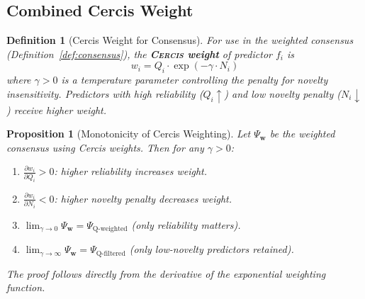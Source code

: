 \documentclass[11pt,a4paper]{article}
\newtheorem{proposition}[theorem]{Proposition}
\newtheorem{definition}[theorem]{Definition}
\theoremstyle{definition}
\newcommand{\cercis}{\textsc{Cercis}}
\newcommand{\consensus}{\Psi}
\begin{document}
\subsection{Combined Cercis Weight}
\begin{definition}[Cercis Weight for Consensus]
For use in the weighted consensus (Definition~\ref{def:consensus}), the \textbf{\cercis{} weight} of predictor $f_i$ is
\begin{equation}
    w_i = Q_i \cdot \exp(-\gamma \cdot N_i)
\end{equation}
where $\gamma > 0$ is a temperature parameter controlling the penalty for novelty insensitivity.
Predictors with high reliability ($Q_i \uparrow$) and low novelty penalty ($N_i \downarrow$) receive higher weight.
\end{definition}
\begin{proposition}[Monotonicity of Cercis Weighting]
\label{prop:cercis-monotone}
Let $\consensus_{\mathbf{w}}$ be the weighted consensus using Cercis weights.
Then for any $\gamma > 0$:
\begin{enumerate}[leftmargin=*,label=(\roman*)]
    \item $\frac{\partial w_i}{\partial Q_i} > 0$: higher reliability increases weight.
    \item $\frac{\partial w_i}{\partial N_i} < 0$: higher novelty penalty decreases weight.
    \item $\lim_{\gamma \to 0} \consensus_{\mathbf{w}} = \consensus_{\text{Q-weighted}}$ (only reliability matters).
    \item $\lim_{\gamma \to \infty} \consensus_{\mathbf{w}} = \consensus_{\text{Q-filtered}}$ (only low-novelty predictors retained).
\end{enumerate}
The proof follows directly from the derivative of the exponential weighting function.
\end{proposition}
\end{document}
